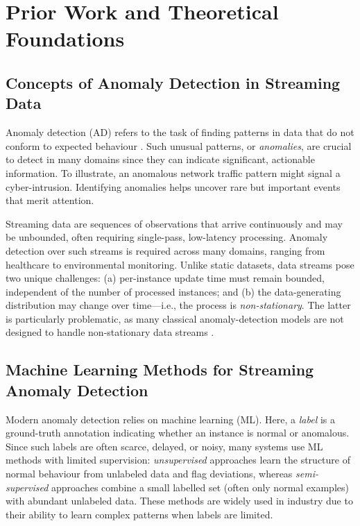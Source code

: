 \documentclass{statsmsc}
\begin{document}
\section{Prior Work and Theoretical Foundations}\label{sec:background}

\subsection{Concepts of Anomaly Detection in Streaming Data}

Anomaly detection (AD) refers to the task of finding patterns in data that do not conform to expected behaviour \citep{chandola2009anomaly}. 
Such unusual patterns, or \emph{anomalies}, are crucial to detect in many domains since they can indicate significant, actionable information. 
To illustrate, an anomalous network traffic pattern might signal a cyber-intrusion. 
Identifying anomalies helps uncover rare but important events that merit attention.

Streaming data are sequences of observations that arrive continuously and may be unbounded, 
often requiring single-pass, low-latency processing. Anomaly detection over such streams
is required across many domains, ranging from healthcare to environmental monitoring. 
Unlike static datasets, data streams pose two unique challenges: (a) per-instance update time must remain bounded, 
independent of the number of processed instances; and 
(b) the data-generating distribution may change over time---i.e., the process is \emph{non-stationary}. The latter is particularly problematic, 
as many classical anomaly-detection models are not designed to handle non-stationary data streams
\citep{iglesias2023streaming}.

\subsection{Machine Learning Methods for Streaming Anomaly Detection}\label{subsec:ml_ad}

Modern anomaly detection relies on machine learning (ML). 
Here, a  \emph{label} is a ground-truth annotation indicating whether an instance is normal or anomalous. 
Since such labels are often scarce, delayed, or noisy, many systems use ML methods with limited supervision: 
 \emph{unsupervised} approaches learn the structure of normal behaviour from unlabeled data and flag deviations, 
whereas  \emph{semi-supervised} approaches combine a small labelled set 
(often only normal examples) with abundant unlabeled data. 
These methods are widely used in industry due to their ability to learn complex patterns when labels are limited.
\end{document}
